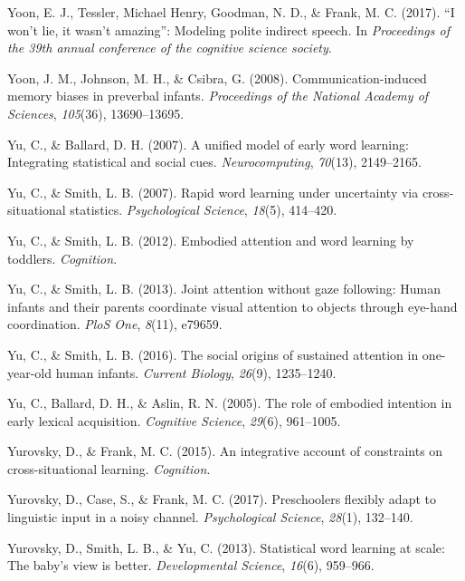 \documentclass[oneside]{report}
\begin{document}
\hypertarget{ref-yoonwon}{}
Yoon, E. J., Tessler, Michael Henry, Goodman, N. D., \& Frank, M. C.
(2017). ``I won't lie, it wasn't amazing'': Modeling polite indirect
speech. In \emph{Proceedings of the 39th annual conference of the
cognitive science society}.

\hypertarget{ref-yoon2008communication}{}
Yoon, J. M., Johnson, M. H., \& Csibra, G. (2008). Communication-induced
memory biases in preverbal infants. \emph{Proceedings of the National
Academy of Sciences}, \emph{105}(36), 13690--13695.

\hypertarget{ref-yu2007unified}{}
Yu, C., \& Ballard, D. H. (2007). A unified model of early word
learning: Integrating statistical and social cues.
\emph{Neurocomputing}, \emph{70}(13), 2149--2165.

\hypertarget{ref-yu2007rapid}{}
Yu, C., \& Smith, L. B. (2007). Rapid word learning under uncertainty
via cross-situational statistics. \emph{Psychological Science},
\emph{18}(5), 414--420.

\hypertarget{ref-yu2012embodied}{}
Yu, C., \& Smith, L. B. (2012). Embodied attention and word learning by
toddlers. \emph{Cognition}.

\hypertarget{ref-yu2013joint}{}
Yu, C., \& Smith, L. B. (2013). Joint attention without gaze following:
Human infants and their parents coordinate visual attention to objects
through eye-hand coordination. \emph{PloS One}, \emph{8}(11), e79659.

\hypertarget{ref-yu2016social}{}
Yu, C., \& Smith, L. B. (2016). The social origins of sustained
attention in one-year-old human infants. \emph{Current Biology},
\emph{26}(9), 1235--1240.

\hypertarget{ref-yu2005role}{}
Yu, C., Ballard, D. H., \& Aslin, R. N. (2005). The role of embodied
intention in early lexical acquisition. \emph{Cognitive Science},
\emph{29}(6), 961--1005.

\hypertarget{ref-yurovsky2014algorithmic}{}
Yurovsky, D., \& Frank, M. C. (2015). An integrative account of
constraints on cross-situational learning. \emph{Cognition}.

\hypertarget{ref-yurovsky2017preschoolers}{}
Yurovsky, D., Case, S., \& Frank, M. C. (2017). Preschoolers flexibly
adapt to linguistic input in a noisy channel. \emph{Psychological
Science}, \emph{28}(1), 132--140.

\hypertarget{ref-yurovsky2013statistical}{}
Yurovsky, D., Smith, L. B., \& Yu, C. (2013). Statistical word learning
at scale: The baby's view is better. \emph{Developmental Science},
\emph{16}(6), 959--966.


\end{document}

